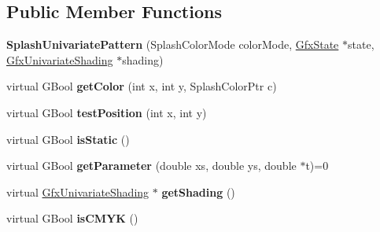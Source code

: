 \subsection*{Public Member Functions}
\begin{DoxyCompactItemize}
\item 
\mbox{\label{class_splash_univariate_pattern_a8db56b63bcf45243f2f7ee18406668c3}} 
{\bfseries Splash\+Univariate\+Pattern} (Splash\+Color\+Mode color\+Mode, \hyperlink{class_gfx_state}{Gfx\+State} $\ast$state, \hyperlink{class_gfx_univariate_shading}{Gfx\+Univariate\+Shading} $\ast$shading)
\item 
\mbox{\label{class_splash_univariate_pattern_aff7e591a4463ec9b0972e98ac232e61a}} 
virtual G\+Bool {\bfseries get\+Color} (int x, int y, Splash\+Color\+Ptr c)
\item 
\mbox{\label{class_splash_univariate_pattern_ad792e992bd53ce0c4ffabe8ba98a9938}} 
virtual G\+Bool {\bfseries test\+Position} (int x, int y)
\item 
\mbox{\label{class_splash_univariate_pattern_a51c7e8d894f780928c5ae9c5021ee56c}} 
virtual G\+Bool {\bfseries is\+Static} ()
\item 
\mbox{\label{class_splash_univariate_pattern_afe2e8d6490376b24a0de156be73ffcea}} 
virtual G\+Bool {\bfseries get\+Parameter} (double xs, double ys, double $\ast$t)=0
\item 
\mbox{\label{class_splash_univariate_pattern_a7be5f4768a770e192342e84657c3ddd9}} 
virtual \hyperlink{class_gfx_univariate_shading}{Gfx\+Univariate\+Shading} $\ast$ {\bfseries get\+Shading} ()
\item 
\mbox{\label{class_splash_univariate_pattern_a1d5027a5c1d1ef03960a82c601fcd8d0}} 
virtual G\+Bool {\bfseries is\+C\+M\+YK} ()
\end{DoxyCompactItemize}
